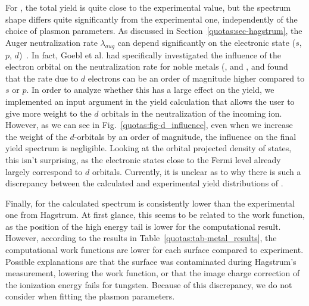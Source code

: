 \begin{refsection}
For , the total yield is quite close to the experimental value, but the spectrum shape differs quite significantly from the experimental one, independently of the choice of plasmon parameters. As discussed in Section~\ref{quotas:sec-hagstrum}, the Auger neutralization rate $\lambda_{aug}$ can depend significantly on the electronic state ($s$, $p$, $d$)~\cite{Goebl2011}. In fact, Goebl et al. had specifically investigated the influence of the electron orbital on the neutralization rate for noble metals (,  and , and found that the rate due to $d$ electrons can be an order of magnitude higher compared to $s$ or $p$. In order to analyze whether this has a large effect on the yield, we implemented an input argument in the yield calculation that allows the user to give more weight to the $d$ orbitals in the neutralization of the incoming ion. However, as we can see in Fig.~\ref{quotas:fig-d_influence}, even when we increase the weight of the $d$-orbitals by an order of magnitude, the influence on the final yield spectrum is negligible. Looking at the orbital projected density of states, this isn't surprising, as the electronic states close to the Fermi level already largely correspond to $d$ orbitals. Currently, it is unclear as to why there is such a discrepancy between the calculated and experimental yield distributions of .

Finally, for  the calculated spectrum is consistently lower than the experimental one from Hagstrum. At first glance, this seems to be related to the work function, as the position of the high energy tail is lower for the computational result. However, according to the results in Table~\ref{quotas:tab-metal_results}, the computational work functions are lower for each surface compared to experiment. Possible explanations are that the  surface was contaminated during Hagstrum's measurement, lowering the work function, or that the image charge correction of the ionization energy fails for tungsten. Because of this discrepancy, we do not consider  when fitting the plasmon parameters.


\end{refsection}
